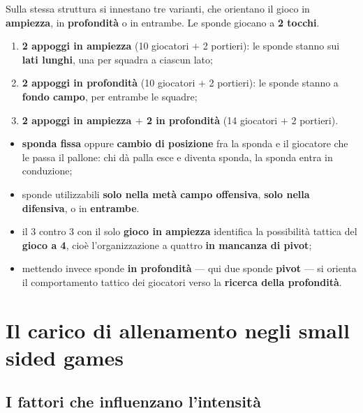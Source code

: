 Sulla stessa struttura si innestano tre varianti, che orientano il gioco in \textbf{ampiezza},
in \textbf{profondità} o in entrambe. Le sponde giocano a \textbf{2 tocchi}.

\begin{enumerate}
  \item \textbf{2 appoggi in ampiezza} (10 giocatori $+$ 2 portieri): le sponde stanno sui
    \textbf{lati lunghi}, una per squadra a ciascun lato;
  \item \textbf{2 appoggi in profondità} (10 giocatori $+$ 2 portieri): le sponde stanno a
    \textbf{fondo campo}, per entrambe le squadre;
  \item \textbf{2 appoggi in ampiezza $+$ 2 in profondità} (14 giocatori $+$ 2 portieri).
\end{enumerate}

\begin{itemize}
  \item \textbf{sponda fissa} oppure \textbf{cambio di posizione} fra la sponda e il giocatore che le
    passa il pallone: chi dà palla esce e diventa sponda, la sponda entra in conduzione;
  \item sponde utilizzabili \textbf{solo nella metà campo offensiva}, \textbf{solo nella difensiva},
    o in \textbf{entrambe}.
\end{itemize}

\begin{itemize}
  \item il 3 contro 3 con il solo \textbf{gioco in ampiezza} identifica la possibilità tattica del
    \textbf{gioco a 4}, cioè l'organizzazione a quattro \textbf{in mancanza di pivot};
  \item mettendo invece sponde \textbf{in profondità} --- qui due sponde \textbf{pivot} --- si
    orienta il comportamento tattico dei giocatori verso la \textbf{ricerca della profondità}.
\end{itemize}

\section{Il carico di allenamento negli small sided games}

\subsection{I fattori che influenzano l'intensità}

